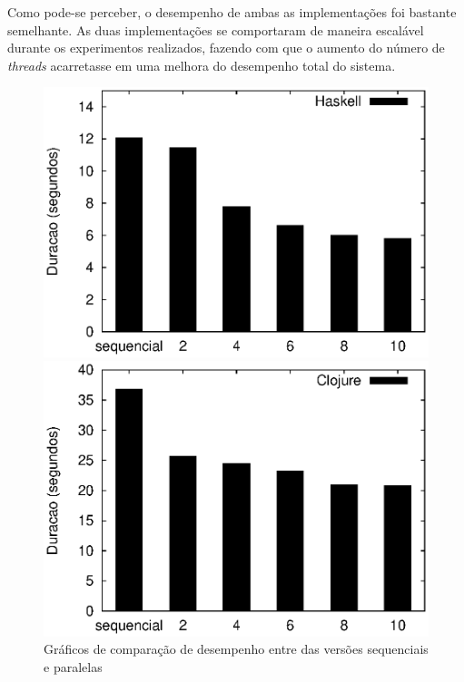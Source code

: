 Como pode-se perceber, o desempenho de ambas as implementações foi bastante semelhante. As duas implementações se comportaram de maneira escalável durante os experimentos realizados, fazendo com que o aumento do número de \emph{threads} acarretasse em uma melhora do desempenho total do sistema.

\begin{figure}[!h]
 \begin{minipage}{0.5\textwidth}
  \centering
  \includegraphics[scale=0.63]{imagens/haskell.eps}
 \end{minipage}
 \begin{minipage}{0.5\textwidth}
  \includegraphics[scale=0.63]{imagens/clojure.eps}
 \end{minipage}
 \caption{Gráficos de comparação de desempenho entre das versões sequenciais e paralelas}
 \label{fig:clj-hs}
\end{figure}

